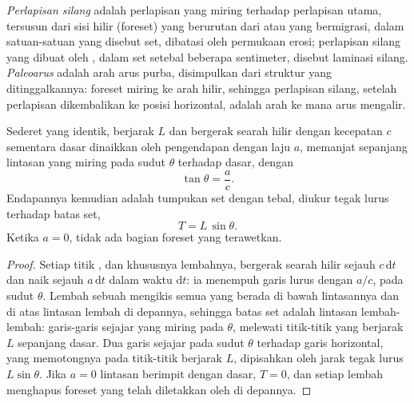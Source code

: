 \begin{definition}\label{def:b1:clastic-sediments:cross-bedding}
\emph{Perlapisan silang} adalah perlapisan yang miring terhadap perlapisan utama, tersusun dari sisi hilir (foreset) yang berurutan dari  atau  yang bermigrasi, dalam satuan-satuan yang disebut set, dibatasi oleh permukaan erosi; perlapisan silang yang dibuat oleh , dalam set setebal beberapa sentimeter, disebut laminasi silang. \emph{Paleoarus} adalah arah arus purba, disimpulkan dari struktur yang ditinggalkannya: foreset miring ke arah hilir, sehingga  perlapisan silang, setelah perlapisan dikembalikan ke posisi horizontal, adalah arah ke mana arus mengalir.
\end{definition}

\begin{proposition}\label{prop:b1:clastic-sediments:climb}
Sederet  yang identik, berjarak $L$ dan bergerak searah hilir dengan kecepatan $c$ sementara dasar dinaikkan oleh pengendapan dengan laju $a$, memanjat sepanjang lintasan yang miring pada sudut $\theta$ terhadap dasar, dengan
\[
  \tan\theta = \frac{a}{c}.
\]
Endapannya kemudian adalah tumpukan set  dengan tebal, diukur tegak lurus terhadap batas set,
\[
  T = L\,\sin\theta .
\]
Ketika $a = 0$, tidak ada bagian foreset yang terawetkan.
\end{proposition}

\begin{proof}
Setiap titik , dan khususnya lembahnya, bergerak searah hilir sejauh $c\,\mathrm dt$ dan naik sejauh $a\,\mathrm dt$ dalam waktu $\mathrm dt$: ia menempuh garis lurus dengan  $a/c$, pada sudut $\theta$. Lembah sebuah  mengikis semua yang berada di bawah lintasannya dan di atas lintasan lembah di depannya, sehingga batas set adalah lintasan lembah-lembah: garis-garis sejajar yang miring pada $\theta$, melewati titik-titik yang berjarak $L$ sepanjang dasar.
Dua garis sejajar pada sudut $\theta$ terhadap garis horizontal, yang memotongnya pada titik-titik berjarak $L$, dipisahkan oleh jarak tegak lurus
$L\sin\theta$. Jika $a = 0$ lintasan berimpit dengan dasar, $T = 0$, dan setiap lembah menghapus foreset yang telah diletakkan oleh  di depannya.
\end{proof}

